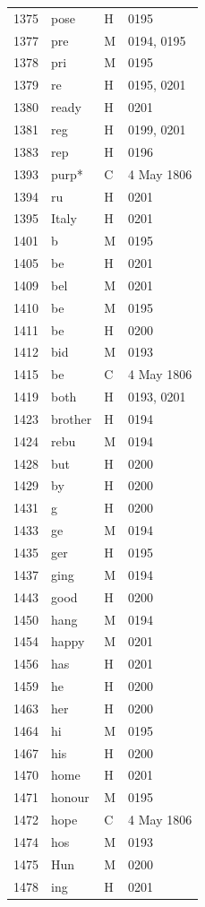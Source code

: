 \begin{longtable}{@{}rlll@{}}
1375 & pose & H & 0195 \\
1377 & pre & M & 0194, 0195 \\
1378 & pri & M & 0195 \\
1379 & re & H & 0195, 0201 \\
1380 & ready & H & 0201 \\
1381 & reg & H & 0199, 0201 \\
1383 & rep & H & 0196 \\
1393 & purp* & C & 4 May 1806 \\
1394 & ru & H & 0201 \\
1395 & Italy & H & 0201 \\
1401 & b & M & 0195 \\
1405 & be & H & 0201 \\
1409 & bel & M & 0201 \\
1410 & be & M & 0195 \\
1411 & be & H & 0200 \\
1412 & bid & M & 0193 \\
1415 & be & C & 4 May 1806 \\
1419 & both & H & 0193, 0201 \\
1423 & brother & H & 0194 \\
1424 & rebu & M & 0194 \\
1428 & but & H & 0200 \\
1429 & by & H & 0200 \\
1431 & g & H & 0200 \\
1433 & ge & M & 0194 \\
1435 & ger & H & 0195 \\
1437 & ging & M & 0194 \\
1443 & good & H & 0200 \\
1450 & hang & M & 0194 \\
1454 & happy & M & 0201 \\
1456 & has & H & 0201 \\
1459 & he & H & 0200 \\
1463 & her & H & 0200 \\
1464 & hi & M & 0195 \\
1467 & his & H & 0200 \\
1470 & home & H & 0201 \\
1471 & honour & M & 0195 \\
1472 & hope & C & 4 May 1806 \\
1474 & hos & M & 0193 \\
1475 & Hun & M & 0200 \\
1478 & ing & H & 0201 \\

\end{longtable}
